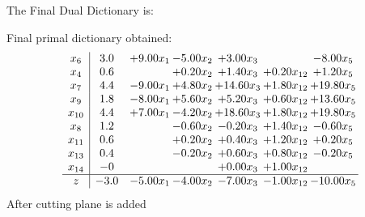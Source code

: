 \documentclass[8pt]{article}
\begin{document}
The Final Dual Dictionary is: 

 Final primal dictionary obtained: 
\[\begin{array}{c| c c@{\hskip 2pt} c@{\hskip 2pt} c@{\hskip 2pt} c@{\hskip 2pt} c@{\hskip 2pt} }
 x_{6}   &  3.0 & +  9.00 x_{1} & -5.00 x_{2} & +  3.00 x_{3} &   & -8.00 x_{5}\\
 x_{4}   &  0.6  &   & +  0.20 x_{2} & +  1.40 x_{3} & +  0.20 x_{12} & +  1.20 x_{5}\\
 x_{7}   &  4.4 & -9.00 x_{1} & +  4.80 x_{2} & + 14.60 x_{3} & +  1.80 x_{12} & + 19.80 x_{5}\\
 x_{9}   &  1.8 & -8.00 x_{1} & +  5.60 x_{2} & +  5.20 x_{3} & +  0.60 x_{12} & + 13.60 x_{5}\\
 x_{10}   &  4.4 & +  7.00 x_{1} & -4.20 x_{2} & + 18.60 x_{3} & +  1.80 x_{12} & + 19.80 x_{5}\\
 x_{8}   &  1.2  &   & -0.60 x_{2} & -0.20 x_{3} & +  1.40 x_{12} & -0.60 x_{5}\\
 x_{11}   &  0.6  &   & +  0.20 x_{2} & +  0.40 x_{3} & +  1.20 x_{12} & +  0.20 x_{5}\\
 x_{13}   &  0.4  &   & -0.20 x_{2} & +  0.60 x_{3} & +  0.80 x_{12} & -0.20 x_{5}\\
 x_{14}   &  -0  &    &   & +  0.00 x_{3} & +  1.00 x_{12} &   \\
\hline
z    &  -3.0 & -5.00 x_{1} & -4.00 x_{2} & -7.00 x_{3} & -1.00 x_{12} & -10.00 x_{5}\\
\end{array}\]
 After cutting plane is added 
\end{document}
